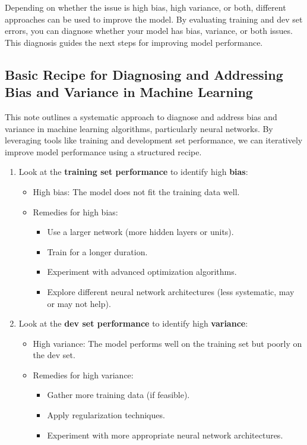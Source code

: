 \documentclass[letterpaper,12pt,notitlepage,twoside]{report}
\begin{document}
Depending on whether the issue is high bias, high variance, or both, different approaches can be used to improve the model. By evaluating training and dev set errors, you can diagnose whether your model has bias, variance, or both issues. This diagnosis guides the next steps for improving model performance.

\subsection*{Basic Recipe for Diagnosing and Addressing Bias and Variance in Machine Learning}

This note outlines a systematic approach to diagnose and address bias and variance in machine learning algorithms, particularly neural networks. By leveraging tools like training and development set performance, we can iteratively improve model performance using a structured recipe.
\begin{enumerate}
    \item Look at the \textbf{training set performance} to identify high \textbf{bias}:
    \begin{itemize}
        \item High bias: The model does not fit the training data well.
        \item Remedies for high bias:
        \begin{itemize}
            \item Use a larger network (more hidden layers or units).
            \item Train for a longer duration.
            \item Experiment with advanced optimization algorithms.
            \item Explore different neural network architectures (less systematic, may or may not help).
        \end{itemize}
    \end{itemize}
    \item Look at the \textbf{dev set performance} to identify high \textbf{variance}:
    \begin{itemize}
        \item High variance: The model performs well on the training set but poorly on the dev set.
        \item Remedies for high variance:
        \begin{itemize}
            \item Gather more training data (if feasible).
            \item Apply regularization techniques.
            \item Experiment with more appropriate neural network architectures.
        \end{itemize}
    \end{itemize}
\end{enumerate}
\end{document}
